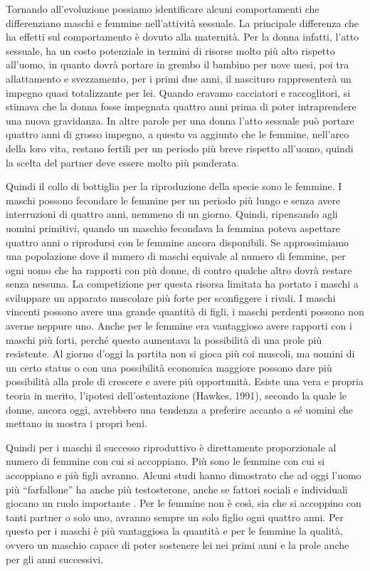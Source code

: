 \documentclass[12pt]{book} %
\begin{document}
Tornando all'evoluzione possiamo identificare alcuni comportamenti che differenziano maschi e
femmine nell'attività sessuale. La principale differenza che ha effetti sul comportamento è dovuto
alla maternità. Per la donna infatti, l'atto sessuale, ha un costo potenziale in termini di
risorse molto più alto rispetto all'uomo, in quanto dovrà portare in grembo il bambino per nove
mesi, poi tra allattamento e svezzamento, per i primi due anni, il nascituro rappresenterà un impegno quasi
totalizzante per lei. Quando eravamo cacciatori e raccoglitori, si stimava che la donna fosse impegnata quattro anni
prima di poter intraprendere una nuova gravidanza. In altre parole per una donna l'atto sessuale
può portare quattro anni di grosso impegno, a questo va aggiunto che le femmine, nell'arco della
loro vita, restano fertili per un periodo più breve rispetto all'uomo, quindi la scelta del
partner deve essere molto più ponderata.

Quindi il collo di bottiglia per la riproduzione della specie sono le femmine. I maschi possono fecondare le femmine per
un periodo più lungo e senza avere interruzioni di quattro anni, nemmeno di un giorno. Quindi, ripensando agli uomini
primitivi, quando un maschio fecondava la femmina poteva aspettare quattro anni o riprodursi con le femmine ancora
disponibili. Se approssimiamo una popolazione dove il numero di maschi equivale al numero di femmine, per ogni uomo che
ha rapporti con più donne, di contro qualche altro dovrà restare senza nessuna. La competizione per questa risorsa
limitata ha portato i maschi a sviluppare un apparato muscolare più forte per sconfiggere i rivali. I maschi vincenti
possono avere una grande quantità di figli, i maschi perdenti possono non averne neppure uno. Anche per le femmine era
vantaggioso avere rapporti con i maschi più forti, perché questo aumentava la possibilità di una prole più resistente.
Al giorno d'oggi la partita non si gioca più coi muscoli, ma uomini di un certo status o con una
possibilità economica maggiore possono dare più possibilità alla prole di crescere e avere più opportunità. Esiste una
vera e propria teoria in merito, l'ipotesi dell'ostentazione (Hawkes, 1991),
secondo la quale le donne, ancora oggi, avrebbero una tendenza a preferire accanto a sé uomini che mettano in mostra i propri beni. 

Quindi per i maschi il successo riproduttivo è direttamente proporzionale al numero di femmine con cui si accoppiano.
Più sono le femmine con cui si accoppiano e più figli avranno. Alcuni studi hanno dimostrato che ad oggi l'uomo più
“farfallone” ha anche più testosterone, anche se fattori sociali e individuali giocano un ruolo importante  . Per le femmine non è così, sia che si accoppino con tanti partner o solo uno,
avranno sempre un solo figlio ogni quattro anni. Per questo per i maschi è più vantaggiosa la quantità e per le femmine
la qualità, ovvero un maschio capace di poter sostenere lei nei primi anni e la prole anche per gli anni successivi.
\end{document}
